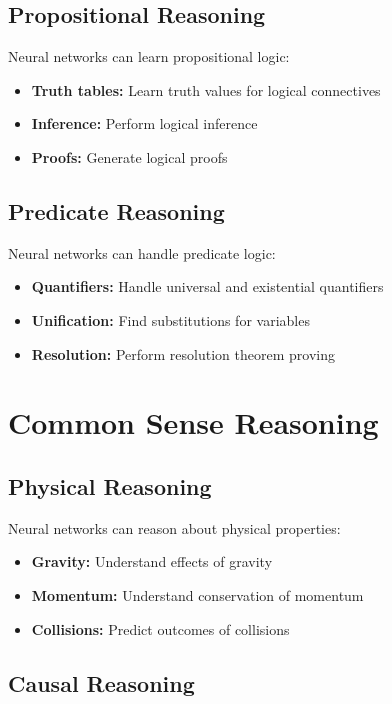 \subsection{Propositional Reasoning}

Neural networks can learn propositional logic:
\begin{itemize}
    \item \textbf{Truth tables:} Learn truth values for logical connectives
    \item \textbf{Inference:} Perform logical inference
    \item \textbf{Proofs:} Generate logical proofs
\end{itemize}

\subsection{Predicate Reasoning}

Neural networks can handle predicate logic:
\begin{itemize}
    \item \textbf{Quantifiers:} Handle universal and existential quantifiers
    \item \textbf{Unification:} Find substitutions for variables
    \item \textbf{Resolution:} Perform resolution theorem proving
\end{itemize}

\section{Common Sense Reasoning}

\subsection{Physical Reasoning}

Neural networks can reason about physical properties:
\begin{itemize}
    \item \textbf{Gravity:} Understand effects of gravity
    \item \textbf{Momentum:} Understand conservation of momentum
    \item \textbf{Collisions:} Predict outcomes of collisions
\end{itemize}

\subsection{Causal Reasoning}

